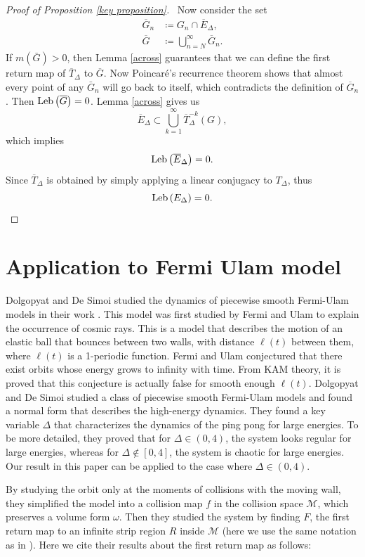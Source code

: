 \documentclass{article}
\numberwithin{figure}{section}
\numberwithin{equation}{section}
\theoremstyle{remark}
\theoremstyle{definition}
\begin{document}
\begin{proof}[Proof of Proposition \ref{key proposition}]\
Now consider the set 
\begin{align*}
    \overline{G}_n & \coloneqq G_n\cap \overline{E}_\Delta,    \\
    \overline{G}&\coloneqq \bigcup_{n=N}^{\infty}\overline{G}_n.
\end{align*}
If $m\left(\bar{G}\right)>0$, then Lemma \ref{across} guarantees that we can define the first return map of $\overline{T}_\Delta$ to $\overline{G}$. Now Poincar\'{e}'s recurrence theorem shows that almost every point of any $\bar{G}_n$ will go back to itself, which contradicts the definition of $\overline{G}_n$. Then ${\rm Leb}\left(\overline{G}\right)=0$.
 Lemma \ref{across} gives us
$$\overline{E}_\Delta\subset\bigcup_{k=1}^{\infty}\overline{T}_\Delta^{-k}(G),$$
 which implies 
 $${\rm Leb}\left(\overline{E}_\Delta\right)=0.$$
Since $\overline{T}_\Delta$ is obtained by simply applying a linear conjugacy to $T_\Delta$, thus
$${\rm Leb}\left({E}_\Delta\right)=0.$$
\end{proof}

\section{Application to Fermi Ulam model}

Dolgopyat and De Simoi studied the dynamics of piecewise smooth Fermi-Ulam models in their work \cite{de2012dynamics}. This model was first studied by Fermi and Ulam to explain the occurrence of cosmic rays. This is a model that describes the motion of an elastic ball that bounces between two walls, with distance $\ell(t)$ between them, where $\ell(t)$ is a 1-periodic function. Fermi and Ulam conjectured that there exist orbits whose energy grows to infinity with time. From KAM theory, it is proved that this conjecture is actually false for smooth enough $\ell(t)$.
Dolgopyat and De Simoi studied a class of piecewise smooth Fermi-Ulam models and found a normal form that describes the high-energy dynamics. They found a key variable $\Delta$ that characterizes the dynamics of the ping pong for large energies. To be more detailed, they proved that for $\Delta \in \left(0,4\right)$, the system looks regular for large energies, whereas for $\Delta \notin \left[0,4\right]$, the system is chaotic for large energies. Our result in this paper can be applied to the case where $\Delta \in \left(0,4\right)$.

By studying the orbit only at the moments of collisions with the moving wall, they simplified the model into a collision map $f$ in the collision space $\mathcal{M}$, which preserves a volume form $\omega$. Then they studied the system by finding $F$, the first return map to an infinite strip region $R$ inside $\mathcal{M}$ (here we use the same notation as in \cite{de2012dynamics}). Here we cite their results about the first return map as follows:
\end{document}
